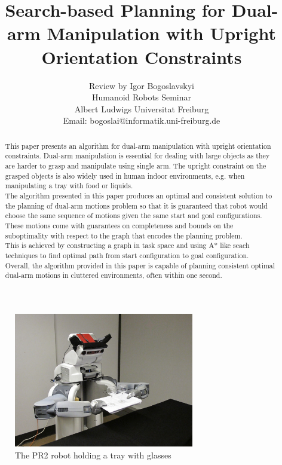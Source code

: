 \documentclass[11pt]{article}
\title{\textbf{Search-based Planning for Dual-arm Manipulation with Upright Orientation Constraints}}
\author{Review by Igor Bogoslavskyi\\
		Humanoid Robots Seminar\\Albert Ludwigs Universitat Freiburg\\
Email: bogoslai@informatik.uni-freiburg.de}
\date{}
\begin{document}
\maketitle

\begin{abstract}
This paper presents an algorithm for dual-arm manipulation with upright orientation constraints. Dual-arm manipulation is essential for dealing with large objects as they are harder to grasp and manipulate using single arm. The upright constraint on the grasped objects is also widely used in human indoor environments, e.g. when manipulating a tray with food or liquids.\\
The algorithm presented in this paper produces an optimal and consistent solution to the planning of dual-arm motions problem so that it is guaranteed that robot would choose the same sequence of motions given the same start and goal configurations. These motions come with guarantees on completeness and bounds on the suboptimality with respect to the graph that encodes the planning problem.\\
This is achieved by constructing a graph in task space and using A* like seach techniques to find optimal path from start configuration to goal configuration.\\
Overall, the algorithm provided in this paper is capable of planning consistent optimal dual-arm motions in cluttered environments, often within one second.

\end{abstract}

\begin{figure}[htb]
\centering
\includegraphics[width=0.7\textwidth]{dual-000.jpg}
\caption{The PR2 robot holding a tray with glasses}
\label{fig:PR2 with glasses}
\end{figure}
\end{document}
